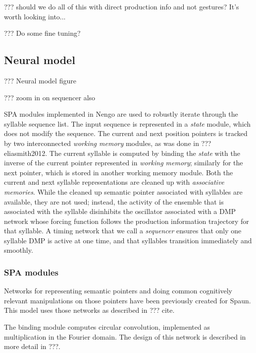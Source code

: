 ??? should we do all of this with direct production info
and not gestures? It's worth looking into...

??? Do some fine tuning?

\subsection{Neural model}

??? Neural model figure

??? zoom in on sequencer also

SPA modules implemented in Nengo are used
to robustly iterate through
the syllable sequence list.
The input sequence is represented
in a \textit{state} module,
which does not modify the sequence.
The current and next position pointers
is tracked by two interconnected
\textit{working memory} modules,
as was done in ??? eliasmith2012.
The current syllable is computed
by binding the \textit{state}
with the inverse of the
current pointer represented
in \textit{working memory};
similarly for the next pointer,
which is stored in another
working memory module.
Both the current and next syllable
representations are cleaned up with
\textit{associative memories}.
While the cleaned up semantic pointer
associated with syllables are available,
they are not used;
instead, the activity of the ensemble
that is associated with the syllable
disinhibits the oscillator
associated with a DMP network
whose forcing function
follows the production information trajectory
for that syllable.
A timing network that we call
a \textit{sequencer} ensures
that only one syllable DMP
is active at one time,
and that syllables transition
immediately and smoothly.

\subsubsection{SPA modules}

Networks for representing semantic pointers
and doing common cognitively relevant
manipulations on those pointers
have been previously created
for Spaun.
This model uses those networks
as described in ??? cite.

The binding module computes
circular convolution,
implemented as multiplication
in the Fourier domain.
The design of this network
is described in more detail in
???.

